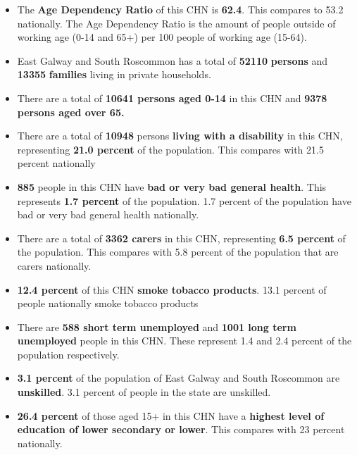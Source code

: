 \documentclass{article}
\begin{document}
\begin{itemize}

\item The \textbf{Age Dependency Ratio} of this CHN is  \textbf{62.4}. This compares to 53.2 nationally. The Age Dependency Ratio is the amount of people outside of working age (0-14 and 65+) per 100 people of working age (15-64). 

\item East Galway and South Roscommon has a total of \textbf{\num{52110}} \textbf{persons} and  \textbf{\num{13355}} \textbf{families} living in private households.

\item There are a total of \textbf{\num{10641} persons aged 0-14} in this CHN and \textbf{\num{9378} persons aged over 65.} 

\item There are a total of \textbf{\num{10948}} persons \textbf{living with a disability} in this CHN, representing \textbf{21.0 percent} of the population. This compares with  21.5 percent nationally

\item \textbf{\num{885}} people in this CHN have \textbf{bad or very bad general health}. This represents \textbf{1.7 percent} of the population. 1.7 percent of the population have bad or very bad general health nationally. 

\item There are a total of \textbf{\num{3362} carers} in this CHN, representing \textbf{6.5 percent} of the population. This compares with 5.8 percent of the population that are carers nationally. 

\item \textbf{12.4 percent} of this CHN \textbf{smoke tobacco products}. 13.1 percent of people nationally smoke tobacco products

\item There are \textbf{\num{588} short term unemployed} and \textbf{\num{1001} long term unemployed} people in this CHN. These represent 1.4 and 2.4 percent of the population respectively.

\item  \textbf{3.1 percent} of the population of East Galway and South Roscommon are \textbf{unskilled}. 3.1 percent of people in the state are unskilled.

\item \textbf{26.4 percent} of those aged 15+ in this CHN have a \textbf{highest level of education of lower secondary or lower}. This compares with 23 percent nationally. 


\end{itemize}
\end{document}
